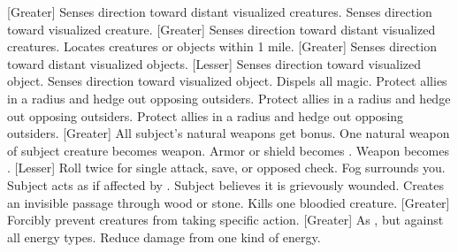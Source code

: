 [Greater]
    {Senses direction toward distant visualized creatures.}
    {Senses direction toward visualized creature.}
    {[Greater] Senses direction toward distant visualized creatures.}
    {Locates creatures or objects within 1 mile.}
[Greater]
    {Senses direction toward distant visualized objects.}
[Lesser]
    {Senses direction toward visualized object.}
    {Senses direction toward visualized object.}
    {Dispels all magic.}
    {Protect allies in a \areamed radius and hedge out opposing outsiders.}
    {Protect allies in a \areamed radius and hedge out opposing outsiders.}
    {Protect allies in a \areamed radius and hedge out opposing outsiders.}
[Greater]
    {All subject's natural weapons get  bonus.}
    {One natural weapon of subject creature becomes  weapon.}
    {Armor or shield becomes .}
    {Weapon becomes .}
[Lesser]
    {Roll twice for single attack, save, or opposed check.}
    {Fog surrounds you.}
    {Subject acts as if affected by .}
    {Subject believes it is grievously wounded.}
    {Creates an invisible passage through wood or stone.}
    {Kills one bloodied creature.}
[Greater]
    {Forcibly prevent creatures from taking specific action.}
[Greater]
    {As , but against all energy types.}
    {Reduce damage from one kind of energy.}
